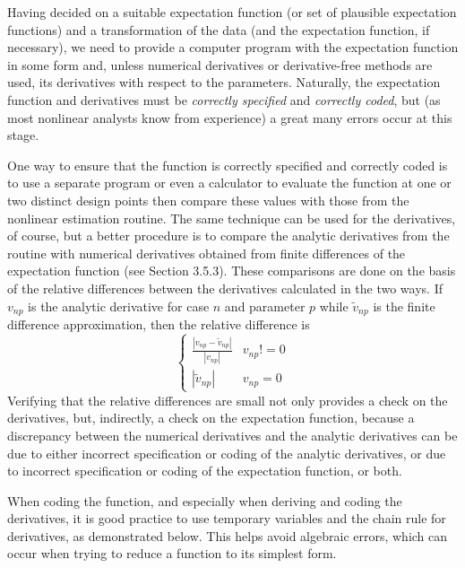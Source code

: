 Having decided on a suitable expectation function (or set of
plausible expectation functions) and a transformation of the data (and the
expectation function, if necessary), we need to provide a
computer program with the expectation function in some form
and, unless numerical derivatives or derivative-free
methods are used, its derivatives with respect to the parameters.
Naturally, the expectation function and derivatives must be
\emph{correctly specified} and \emph{correctly coded}, but (as
most nonlinear analysts know from experience) a great many errors
occur at this stage.

One way to ensure that the function is correctly specified and
correctly coded is to use a separate program or even a calculator
to evaluate the function at one or two distinct design points then
compare these values with those from the nonlinear estimation routine.
The same technique can be used for the derivatives, of course,
but a better procedure is to compare the analytic
derivatives from the routine with numerical derivatives obtained
from finite differences of the expectation function (see Section 3.5.3).
These comparisons are done on the basis of the relative
differences between the derivatives calculated in the two ways.
If $v_{np}$ is the analytic derivative for case $n$ and
parameter $p$ while $\tilde v_{np}$ is the finite difference
approximation, then the relative difference is
\begin{displaymath}
  \begin{cases}
    \frac{| v_{np}-\tilde v_{np}|}{|v_{np}|} & v_{np} != 0\\
    |\tilde v_{np} | & v_{np} = 0
  \end{cases}
\end{displaymath}
Verifying that the relative differences are small
not only provides a check on the derivatives, but,
indirectly, a check on the expectation function, because a
discrepancy between the numerical derivatives and the analytic
derivatives can be due to either incorrect specification or
coding of the analytic derivatives, or due to incorrect
specification or coding of the expectation function, or both.

When coding the function, and especially when deriving and coding
the derivatives, it is good practice to use temporary variables
and the chain rule for derivatives, as demonstrated below.
This helps avoid algebraic errors, which can occur when trying to
reduce a function to its simplest form.

